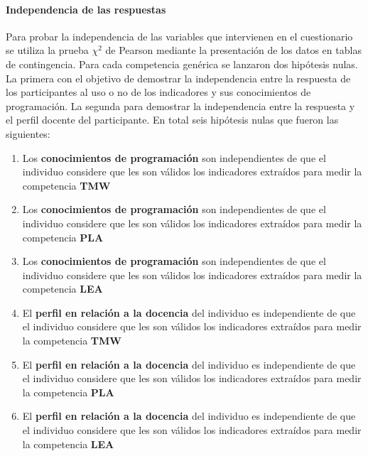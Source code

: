 \paragraph*{Independencia de las respuestas}

Para probar la independencia de las variables que intervienen en el cuestionario se utiliza la prueba $\chi^2$ de Pearson mediante la presentación de los datos en tablas de contingencia. Para cada competencia genérica se lanzaron dos hipótesis nulas. La primera con el objetivo de demostrar la independencia entre la respuesta de los participantes al uso o no de los indicadores y sus conocimientos de programación. La segunda para demostrar la independencia entre la respuesta y el perfil docente del participante. En total seis hipótesis nulas que fueron las siguientes:

\begin{enumerate}
\item Los \textbf{conocimientos de programación} son independientes de que el individuo considere que les son válidos los indicadores extraídos para medir la competencia \textbf{TMW}
\item Los \textbf{conocimientos de programación} son independientes de que el individuo considere que les son válidos los indicadores extraídos para medir la competencia \textbf{PLA}
\item Los \textbf{conocimientos de programación} son independientes de que el individuo considere que les son válidos los indicadores extraídos para medir la competencia \textbf{LEA}
\item El \textbf{perfil en relación a la docencia} del individuo es independiente de que el individuo considere que les son válidos los indicadores extraídos para medir la competencia \textbf{TMW}
\item El \textbf{perfil en relación a la docencia} del individuo es independiente de que el individuo considere que les son válidos los indicadores extraídos para medir la competencia \textbf{PLA}
\item El \textbf{perfil en relación a la docencia} del individuo es independiente de que el individuo considere que les son válidos los indicadores extraídos para medir la competencia \textbf{LEA}
\end{enumerate}


